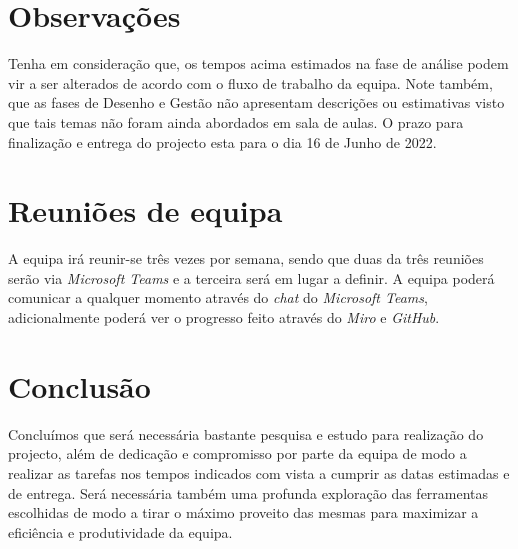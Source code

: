\documentclass[a4paper]{article}
\begin{document}
\section{Observações}
Tenha em consideração que, os tempos acima estimados na fase de análise podem vir a ser alterados de acordo com o fluxo de trabalho da equipa. Note também, que as fases de Desenho e Gestão não apresentam descrições ou estimativas visto que tais temas não foram ainda abordados em sala de aulas.
O prazo para finalização e entrega do projecto esta para o dia 16 de Junho de 2022.


\section{Reuniões de equipa}
A equipa irá reunir-se três vezes por semana, sendo que duas da três reuniões serão via \textit{Microsoft Teams} e a terceira será em lugar a definir.
A equipa poderá comunicar a qualquer momento através do \textit{chat} do \textit{Microsoft Teams}, adicionalmente poderá ver o progresso feito através do \textit{Miro} e \textit{GitHub}.

\newpage
\section{Conclusão}
Concluímos que será necessária bastante pesquisa e estudo para realização do projecto, além de dedicação e compromisso por parte da equipa de modo a realizar as tarefas nos tempos indicados com vista a cumprir as datas estimadas e de entrega. Será necessária também uma profunda exploração das ferramentas escolhidas de modo a tirar o máximo proveito das mesmas para maximizar a eficiência e produtividade da equipa.

\newpage


\end{document}
